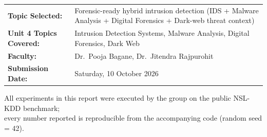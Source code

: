\documentclass[12pt,a4paper,oneside]{article}
\begin{document}
\begin{titlepage}
\begin{tcolorbox}[enhanced,colback=white,colframe=rblue,boxrule=1.6pt,arc=0pt,height=\textheight,valign=top,left=14pt,right=14pt,top=10pt]
\begin{tabular}{>{\raggedleft\arraybackslash}p{4.4cm} >{\raggedright\arraybackslash}p{9.2cm}}
\textbf{Topic Selected:} & Forensic-ready hybrid intrusion detection (IDS + Malware Analysis + Digital Forensics + Dark-web threat context) \\[4pt]
\textbf{Unit 4 Topics Covered:} & Intrusion Detection Systems, Malware Analysis, Digital Forensics, Dark Web \\[4pt]
\textbf{Faculty:} & Dr.\ Pooja Bagane, Dr.\ Jitendra Rajpurohit \\[4pt]
\textbf{Submission Date:} & Saturday, 10 October 2026 \\
\end{tabular}
\vfill
{\small\color{rblue} All experiments in this report were executed by the group on the public NSL-KDD benchmark;\\ every number reported is reproducible from the accompanying code (random seed = 42).}
\end{tcolorbox}
\end{titlepage}

\end{document}
